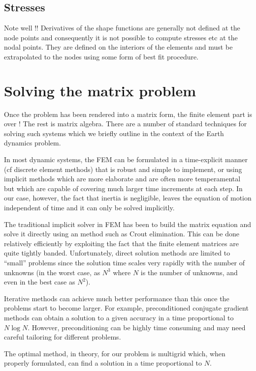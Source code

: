 \documentclass[10pt]{article}
\begin{document}
\subsection{Stresses}

	Note well !! Derivatives of the shape functions are generally not defined
	at the node points and consequently it is not possible to compute stresses etc
	at the nodal points. They are defined on the interiors of the elements and 
	must be extrapolated to the nodes using some form of best fit procedure.		
		
\section{Solving the matrix problem}
	Once the problem has been rendered into a matrix form, the finite element
	part is over !  The rest is matrix algebra. There are a number of standard techniques
	for solving such systems which we briefly outline in the context of 
	the Earth dynamics problem.

	In most dynamic systems, the FEM can be formulated
	in a time-explicit manner (cf discrete element methods) that 
	is robust and simple to implement, or using implicit
	methods which are more elaborate and are often
	more temperamental but which are capable of covering
	much larger time increments at each step.
	In our case, however, the fact that inertia is negligible,
	leaves the equation of motion independent of time and 
	it can only be solved implicitly.    

	The traditional implicit solver in FEM has been to 
	build the matrix equation and solve it directly using
	an method such as Crout elimination.
	This can be done relatively efficiently
	by exploiting the fact that the finite element matrices are quite
	tightly banded.  Unfortunately,
	direct solution methods are limited to ``small'' problems since the solution	time
	scales very rapidly with the number of unknowns (in the worst case,
	as $N^3$ where $N$ is the number of unknowns, and even in the best
	case as $N^2$). 
	
	Iterative methods can achieve much better performance
	than this once the problems start to become larger. For example, 
	preconditioned conjugate gradient methods can obtain a solution to 
	a given accuracy in a time proportional to $N\log N$. However, preconditioning 
	can be highly time consuming and may need careful tailoring for different problems.
	
	The optimal method, in 
	theory, for our problem is multigrid which, when properly formulated, can
	find a solution in a time proportional to $N$. 
	
\end{document}
